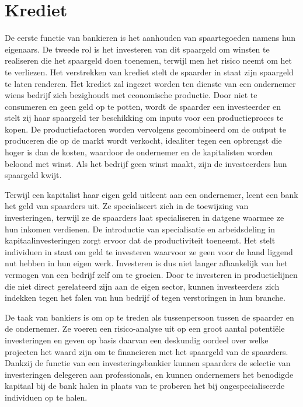 \documentclass[
  a5paper,
  smalldemyvopaper,11pt,twoside,onecolumn,openright,extrafontsizes,
hidelinks]{memoir}
\begin{document}
\section{Krediet}\label{krediet}

De eerste functie van bankieren is het aanhouden van spaartegoeden
namens hun eigenaars. De tweede rol is het investeren van dit spaargeld
om winsten te realiseren die het spaargeld doen toenemen, terwijl men
het risico neemt om het te verliezen. Het verstrekken van krediet stelt
de spaarder in staat zijn spaargeld te laten renderen. Het krediet zal
ingezet worden ten dienste van een ondernemer wiens bedrijf zich
bezighoudt met economische productie. Door niet te consumeren en geen
geld op te potten, wordt de spaarder een investeerder en stelt zij haar
spaargeld ter beschikking om inputs voor een productieproces te kopen.
De productiefactoren worden vervolgens gecombineerd om de output te
produceren die op de markt wordt verkocht, idealiter tegen een opbrengst
die hoger is dan de kosten, waardoor de ondernemer en de kapitalisten
worden beloond met winst. Als het bedrijf geen winst maakt, zijn de
investeerders hun spaargeld kwijt.

Terwijl een kapitalist haar eigen geld uitleent aan een ondernemer,
leent een bank het geld van spaarders uit. Ze specialiseert zich in de
toewijzing van investeringen, terwijl ze de spaarders laat specialiseren
in datgene waarmee ze hun inkomen verdienen. De introductie van
specialisatie en arbeidsdeling in kapitaalinvesteringen zorgt ervoor dat
de productiviteit toeneemt. Het stelt individuen in staat om geld te
investeren waarvoor ze geen voor de hand liggend nut hebben in hun eigen
werk. Investeren is dus niet langer afhankelijk van het vermogen van een
bedrijf zelf om te groeien. Door te investeren in productielijnen die
niet direct gerelateerd zijn aan de eigen sector, kunnen investeerders
zich indekken tegen het falen van hun bedrijf of tegen verstoringen in
hun branche.

De taak van bankiers is om op te treden als tussenpersoon tussen de
spaarder en de ondernemer. Ze voeren een risico-analyse uit op een groot
aantal potentiële investeringen en geven op basis daarvan een deskundig
oordeel over welke projecten het waard zijn om te financieren met het
spaargeld van de spaarders. Dankzij de functie van een
investeringsbankier kunnen spaarders de selectie van investeringen
delegeren aan professionals, en kunnen ondernemers het benodigde
kapitaal bij de bank halen in plaats van te proberen het bij
ongespecialiseerde individuen op te halen.
\end{document}

